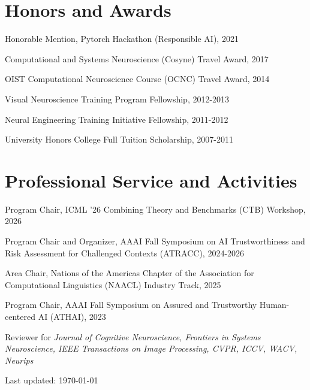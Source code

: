 \documentclass[10pt,letterpaper]{article}
\def\footerlink{} %
\renewenvironment{itemize}{
  \begin{list}{}{
    \setlength{\leftmargin}{1.5em}
    \setlength{\itemsep}{0.25em}
    \setlength{\parskip}{0pt}
    \setlength{\parsep}{0.25em}
  }
}{
  \end{list}
}
\begin{document}
\vspace{-0.25in}

\section*{Honors and Awards}
\vspace{-0.05in}
\begin{itemize}
  \setlength\itemsep{1pt}
  \item Honorable Mention, Pytorch Hackathon (Responsible AI), 2021
  \item Computational and Systems Neuroscience (Cosyne) Travel Award, 2017
  \item OIST Computational Neuroscience Course (OCNC) Travel Award, 2014
  \item Visual Neuroscience Training Program Fellowship, 2012-2013
  \item Neural Engineering Training Initiative Fellowship, 2011-2012
  \item University Honors College Full Tuition Scholarship, 2007-2011
\end{itemize}

\vspace{-0.25in}

\section*{Professional Service and Activities}
\vspace{-0.05in}
\begin{itemize}
  \setlength\itemsep{1pt}
  \item Program Chair, ICML '26 Combining Theory and Benchmarks (CTB) Workshop, 2026
  \item Program Chair and Organizer, AAAI Fall Symposium on AI Trustworthiness and Risk Assessment for Challenged Contexts (ATRACC), 2024-2026
  \item Area Chair, Nations of the Americas Chapter of the Association for Computational Linguistics (NAACL) Industry Track, 2025
  \item Program Chair, AAAI Fall Symposium on Assured and Trustworthy Human-centered AI (ATHAI), 2023
  \item Reviewer for \textit{Journal of Cognitive Neuroscience, Frontiers in Systems Neuroscience, IEEE Transactions on Image Processing, CVPR, ICCV, WACV, Neurips}
\end{itemize}

\bigskip

\begin{center}
  \begin{footnotesize}
    Last updated: \today \\
    \href{\footerlink}{\texttt{\footerlink}}
  \end{footnotesize}
\end{center}
\end{document}
